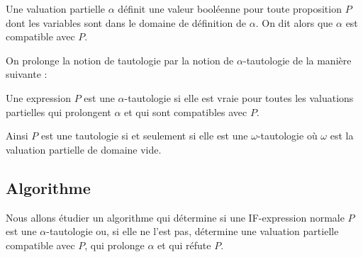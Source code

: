 \bigskip


Une valuation partielle $\alpha$ définit une valeur booléenne pour toute proposition $P$ dont les variables sont dans le domaine de définition de $\alpha$. On dit alors que $\alpha$ est compatible avec $P$.

On prolonge la notion de tautologie par la notion de $\alpha$-tautologie de la manière suivante :
\begin{defin}
Une expression $P$ est une $\alpha$-tautologie si elle est vraie pour toutes les valuations partielles qui prolongent $\alpha$ et qui sont compatibles avec $P$.
\end{defin}
Ainsi $P$ est une tautologie si et seulement si elle est une $\omega$-tautologie où $\omega$ est la valuation partielle de domaine vide.
\subsection{Algorithme}

Nous allons étudier un algorithme qui détermine si une IF-expression normale $P$ est une $\alpha$-tautologie 
ou, si elle ne l'est pas, détermine une valuation partielle compatible avec $P$, qui prolonge 
$\alpha$ et qui réfute $P$.

